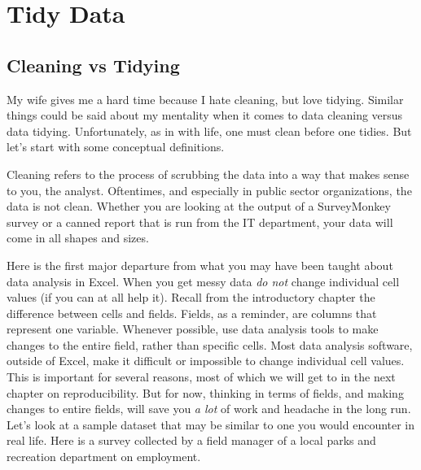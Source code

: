 \documentclass[]{book}
\begin{document}
\chapter{Tidy Data}\label{tidy-data}

\section{Cleaning vs Tidying}\label{cleaning-vs-tidying}

My wife gives me a hard time because I hate cleaning, but love tidying.
Similar things could be said about my mentality when it comes to data
cleaning versus data tidying. Unfortunately, as in with life, one must
clean before one tidies. But let's start with some conceptual
definitions.

Cleaning refers to the process of scrubbing the data into a way that
makes sense to you, the analyst. Oftentimes, and especially in public
sector organizations, the data is not clean. Whether you are looking at
the output of a SurveyMonkey survey or a canned report that is run from
the IT department, your data will come in all shapes and sizes.

Here is the first major departure from what you may have been taught
about data analysis in Excel. When you get messy data \emph{do not}
change individual cell values (if you can at all help it). Recall from
the introductory chapter the difference between cells and fields.
Fields, as a reminder, are columns that represent one variable. Whenever
possible, use data analysis tools to make changes to the entire field,
rather than specific cells. Most data analysis software, outside of
Excel, make it difficult or impossible to change individual cell values.
This is important for several reasons, most of which we will get to in
the next chapter on reproducibility. But for now, thinking in terms of
fields, and making changes to entire fields, will save you \emph{a lot}
of work and headache in the long run. Let's look at a sample dataset
that may be similar to one you would encounter in real life. Here is a
survey collected by a field manager of a local parks and recreation
department on employment.
\end{document}
